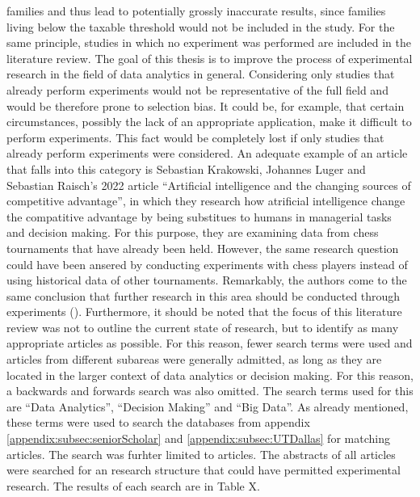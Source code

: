 families and thus lead to potentially grossly inaccurate results, since families living below the taxable threshold would not be included in the study. For the same principle, studies in which no experiment was performed are included in the literature review. The goal of this thesis is to improve the process of experimental research in the field of data analytics in general. Considering only studies that already perform experiments would not be representative of the full field and would be therefore prone to selection bias. It could be, for example, that certain circumstances, possibly the lack of an appropriate application, make it difficult to perform experiments. This fact would be completely lost if only studies that already perform experiments were considered. An adequate example of an article that falls into this category is Sebastian Krakowski, Johannes Luger and Sebastian Raisch's 2022 article \enquote{Artificial intelligence and the changing sources of competitive advantage}, in which they research how atrificial intelligence change the compatitive advantage by being substitues to humans in managerial tasks and decision making. For this purpose, they are examining data from chess tournaments that have already been held. However, the same research question could have been ansered by conducting experiments with chess players instead of using historical data of other tournaments. Remarkably, the authors come to the same conclusion that further research in this area should be conducted through experiments (\cite{Krakowski.2022}). Furthermore, it should be noted that the focus of this literature review was not to outline the current state of research, but to identify as many appropriate articles as possible. For this reason, fewer search terms were used and articles from different subareas were generally admitted, as long as they are located in the larger context of data analytics or decision making. For this reason, a backwards and forwards search was also omitted.
The search terms used for this are \enquote{Data Analytics}, \enquote{Decision Making} and \enquote{Big Data}. As already mentioned, these terms were used to search the databases from appendix \ref{appendix:subsec:seniorScholar} and \ref{appendix:subsec:UTDallas} for matching articles. The search was furhter limited to articles. The abstracts of all articles were searched for an research structure that could have permitted experimental research. The results of each search are in Table X.


